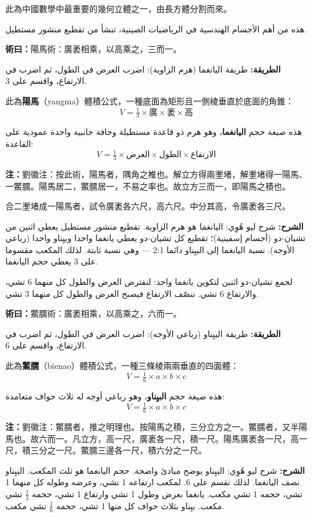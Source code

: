 \documentclass[11pt,a4paper]{article}
\newcommand{\ChinCol}[1]{\begin{minipage}[t]{0.48\textwidth}#1\end{minipage}}
\newcommand{\ArabCol}[1]{\begin{minipage}[t]{0.48\textwidth}\arabicfont\beginR #1\endR\end{minipage}}
\newcommand{\parallelsection}[2]{%
  \noindent\ChinCol{#1}\hfill\ArabCol{#2}\par\vspace{0.5cm}%
}
\newcommand{\method}[2]{\par\noindent%
  \begin{minipage}[t]{0.48\textwidth}\textbf{術曰：}#1\end{minipage}%
  \hfill%
  \begin{minipage}[t]{0.48\textwidth}\arabicfont\beginR\textbf{الطريقة:} #2\endR\end{minipage}\par\vspace{0.3cm}}
\newcommand{\commentary}[2]{\par\noindent%
  \begin{minipage}[t]{0.48\textwidth}\textbf{注：}#1\end{minipage}%
  \hfill%
  \begin{minipage}[t]{0.48\textwidth}\arabicfont\beginR\textbf{الشرح:} #2\endR\end{minipage}\par\vspace{0.2cm}}
\begin{document}
\parallelsection{此為中國數學中最重要的幾何立體之一，由長方體分割而來。}{هذه من أهم الأجسام الهندسية في الرياضيات الصينية، تنشأ من تقطيع منشور مستطيل.}

\method{陽馬術：廣袤相乘，以高乘之，三而一。}{طريقة اليانغما (هرم الزاوية): اضرب العرض في الطول، ثم اضرب في الارتفاع، واقسم على 3.}

\parallelsection{此為\textbf{陽馬}（yangma）體積公式，一種底面為矩形且一側棱垂直於底面的角錐：
\[V = \tfrac{1}{3} \times \text{廣} \times \text{袤} \times \text{高}\]}{هذه صيغة حجم \textbf{اليانغما}، وهو هرم ذو قاعدة مستطيلة وحافة جانبية واحدة عمودية على القاعدة:
\[V = \tfrac{1}{3} \times \text{العرض} \times \text{الطول} \times \text{الارتفاع}\]}

\commentary{劉徽注：按此術，陽馬者，隅角之椎也。解立方得兩壍堵，解壍堵得一陽馬、一鱉臑。陽馬居二，鱉臑居一，不易之率也。故立方三而一，即陽馬之積也。

合二壍堵成一陽馬者，試令廣袤各六尺，高六尺。中分其高，令廣袤各三尺。}{شرح ليو هُوِي: اليانغما هو هرم الزاوية. تقطيع منشور مستطيل يعطي اثنين من تشيان-دو (أجسام إسفينية)؛ تقطيع كل تشيان-دو يعطي يانغما واحدا وبيِناو واحدا (رباعي الأوجه). نسبة اليانغما إلى البيِناو دائما 2:1 --- وهي نسبة ثابتة. لذلك المكعب مقسوما على 3 يعطي حجم اليانغما.

لجمع تشيان-دو اثنين لتكوين يانغما واحد: لنفترض العرض والطول كل منهما 6 تشي، والارتفاع 6 تشي. ننصّف الارتفاع فيصبح العرض والطول كل منهما 3 تشي.}

\vspace{0.2cm}

\method{鱉臑術：廣袤相乘，以高乘之，六而一。}{طريقة البيِناو (رباعي الأوجه): اضرب العرض في الطول، ثم اضرب في الارتفاع، واقسم على 6.}

\parallelsection{此為\textbf{鱉臑}（bienao）體積公式，一種三條棱兩兩垂直的四面體：
\[V = \tfrac{1}{6} \times a \times b \times c\]}{هذه صيغة حجم \textbf{البيِناو}، وهو رباعي أوجه له ثلاث حواف متعامدة:
\[V = \tfrac{1}{6} \times a \times b \times c\]}

\commentary{劉徽注：鱉臑者，推之明理也。按陽馬之積，三分立方之一。鱉臑者，又半陽馬也。故六而一。凡立方，高一尺，廣袤各一尺，積一尺。陽馬廣袤各一尺，高一尺，積三分之一尺。鱉臑三邊各一尺，積六分之一尺。}{شرح ليو هُوِي: البيِناو يوضح مبادئ واضحة. حجم اليانغما هو ثلث المكعب. البيِناو نصف اليانغما. لذلك نقسم على 6. لمكعب ارتفاعه 1 تشي، وعرضه وطوله كل منهما 1 تشي، حجمه 1 تشي مكعب. يانغما بعرض وطول 1 تشي وارتفاع 1 تشي، حجمه $\frac{1}{3}$ تشي مكعب. بيِناو بثلاث حواف كل منها 1 تشي، حجمه $\frac{1}{6}$ تشي مكعب.}
\end{document}
